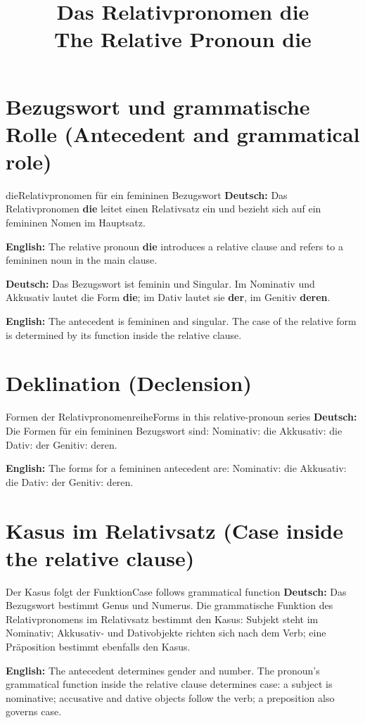 \documentclass[a4paper,11pt]{article}
\title{Das Relativpronomen \glqq die\grqq{}\\\large The Relative Pronoun \glqq die\grqq{}}
\date{}
\newcommand{\GermanText}[1]{\textbf{Deutsch: }#1\par}
\newcommand{\EnglishText}[1]{{\small\color{SoftGray}\textbf{English: }#1\par}}
\begin{document}
\maketitle
\tableofcontents
\newpage

\section{Bezugswort und grammatische Rolle (Antecedent and grammatical role)}
\begin{grammarentry}{die}{Relativpronomen für ein femininen Bezugswort}
\GermanText{Das Relativpronomen \textbf{die} leitet einen Relativsatz ein und bezieht sich auf ein femininen Nomen im Hauptsatz.}
\EnglishText{The relative pronoun \textbf{die} introduces a relative clause and refers to a femininen noun in the main clause.}
\GermanText{Das Bezugswort ist feminin und Singular. Im Nominativ und Akkusativ lautet die Form \textbf{die}; im Dativ lautet sie \textbf{der}, im Genitiv \textbf{deren}.}
\EnglishText{The antecedent is femininen and singular. The case of the relative form is determined by its function inside the relative clause.}
\end{grammarentry}

\section{Deklination (Declension)}
\begin{grammarentry}{Formen der Relativpronomenreihe}{Forms in this relative-pronoun series}
\GermanText{Die Formen für ein femininen Bezugswort sind: Nominativ: die \quad Akkusativ: die \quad Dativ: der \quad Genitiv: deren.}
\EnglishText{The forms for a femininen antecedent are: Nominativ: die \quad Akkusativ: die \quad Dativ: der \quad Genitiv: deren.}
\end{grammarentry}

\section{Kasus im Relativsatz (Case inside the relative clause)}
\begin{grammarentry}{Der Kasus folgt der Funktion}{Case follows grammatical function}
\GermanText{Das Bezugswort bestimmt Genus und Numerus. Die grammatische Funktion des Relativpronomens im Relativsatz bestimmt den Kasus: Subjekt steht im Nominativ; Akkusativ- und Dativobjekte richten sich nach dem Verb; eine Präposition bestimmt ebenfalls den Kasus.}
\EnglishText{The antecedent determines gender and number. The pronoun's grammatical function inside the relative clause determines case: a subject is nominative; accusative and dative objects follow the verb; a preposition also governs case.}
\end{grammarentry}
\end{document}
